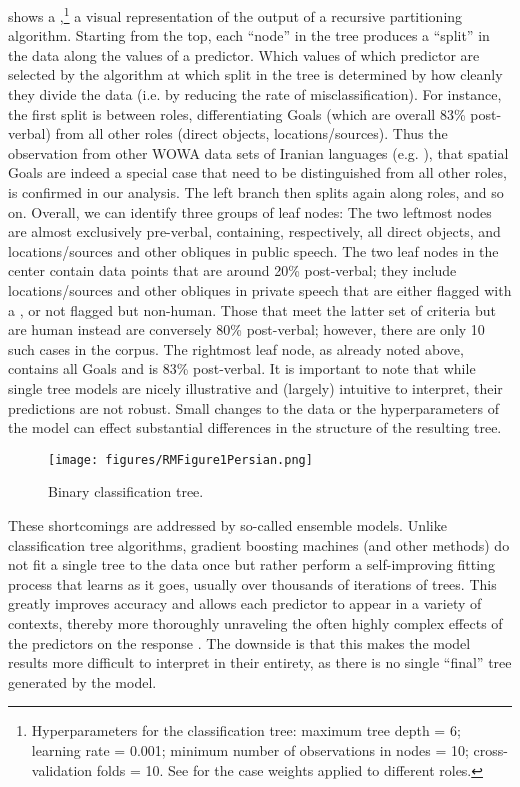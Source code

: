 \documentclass[output=paper,colorlinks,citecolor=brown,draftmode]{langscibook}
\begin{document}
 shows a ,\footnote{Hyperparameters for the classification tree: maximum tree depth = 6; learning rate = 0.001; minimum number of observations in nodes = 10; cross-validation folds = 10. See  for the case weights applied to different roles.} a visual representation of the output of a recursive partitioning algorithm. Starting from the top, each ``node'' in the tree produces a ``split'' in the data along the values of a predictor. Which values of which predictor are selected by the algorithm at which split in the tree is determined by how cleanly they divide the data (i.e. by reducing the rate of misclassification). For instance, the first split is between roles, differentiating Goals (which are overall 83\% post-verbal) from all other roles (direct objects, locations/sources). Thus the observation from other WOWA data sets of Iranian languages (e.g. ), that spatial Goals are indeed a special case that need to be distinguished from all other roles, is confirmed in our analysis. The left branch then splits again along roles, and so on. Overall, we can identify three groups of leaf nodes: The two leftmost nodes are almost exclusively pre-verbal, containing, respectively, all direct objects, and locations/sources and other obliques in public speech. The two leaf nodes in the center contain data points that are around 20\% post-verbal; they include locations/sources and other obliques in private speech that are either flagged with a , or not flagged but non-human. Those that meet the latter set of criteria but are human instead are conversely 80\% post-verbal; however, there are only 10 such cases in the corpus. The rightmost leaf node, as already noted above, contains all Goals and is 83\% post-verbal. It is important to note that while single tree models are nicely illustrative and (largely) intuitive to interpret, their predictions are not robust. Small changes to the data or the hyperparameters of the model can effect substantial differences in the structure of the resulting tree.

\begin{figure}
 \texttt{[image: figures/RMFigure1Persian.png]}
 \caption{Binary classification tree.}
 \label{Persian:fig:1}
\end{figure}

These shortcomings are addressed by so-called ensemble models. Unlike classification tree algorithms, gradient boosting machines (and other methods) do not fit a single tree to the data once but rather perform a self-improving fitting process that learns as it goes, usually over thousands of iterations of trees. This greatly improves accuracy and allows each predictor to appear in a variety of contexts, thereby more thoroughly unraveling the often highly complex effects of the predictors on the response \citep[336]{Strobl2009recursive}. The downside is that this makes the model results more difficult to interpret in their entirety, as there is no single ``final'' tree generated by the model. 
\end{document}
